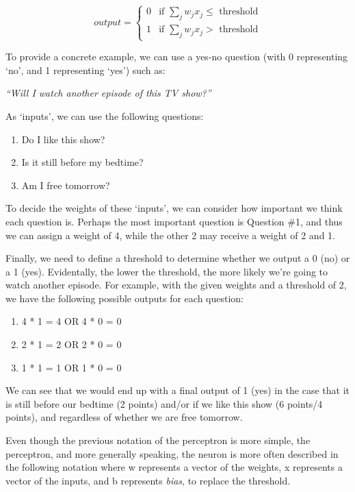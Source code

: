 \documentclass
[
    a4paper,
    twoside,
    12pt,
]
{report}
\begin{document}
\begin{equation*}
    output=\begin{cases}
        0 & \text{if $\sum_{j} w_jx_j \leq$ threshold} \\
        1 & \text{if $\sum_{j} w_jx_j >$ threshold}
    \end{cases}
\end{equation*}

To provide a concrete example, we can use a yes-no question (with 0
representing `no', and 1 representing `yes') such as:

\emph{``Will I watch another episode of this TV show?''}

As `inputs', we can use the following questions:

\begin{enumerate}
\def\labelenumi{\arabic{enumi}.}
\tightlist
\item
  Do I like this show?
\item
  Is it still before my bedtime?
\item
  Am I free tomorrow?
\end{enumerate}

To decide the weights of these `inputs', we can consider how important
we think each question is. Perhaps the most important question is
Question \#1, and thus we can assign a weight of 4, while the other 2
may receive a weight of 2 and 1.

Finally, we need to define a threshold to determine whether we output a
0 (no) or a 1 (yes). Evidentally, the lower the threshold, the more
likely we're going to watch another episode. For example, with the given
weights and a threshold of 2, we have the following possible outputs for
each question:

\begin{enumerate}
\def\labelenumi{\arabic{enumi}.}
\tightlist
\item
  4 * 1 = 4 OR 4 * 0 = 0
\item
  2 * 1 = 2 OR 2 * 0 = 0
\item
  1 * 1 = 1 OR 1 * 0 = 0
\end{enumerate}

We can see that we would end up with a final output of 1 (yes) in the
case that it is still before our bedtime (2 points) and/or if we like
this show (6 points/4 points), and regardless of whether we are free
tomorrow.

Even though the previous notation of the perceptron is more simple, the
perceptron, and more generally speaking, the neuron is more often
described in the following notation where w represents a vector of the
weights, x represents a vector of the inputs, and b represents
\emph{bias}, to replace the threshold.
\end{document}
